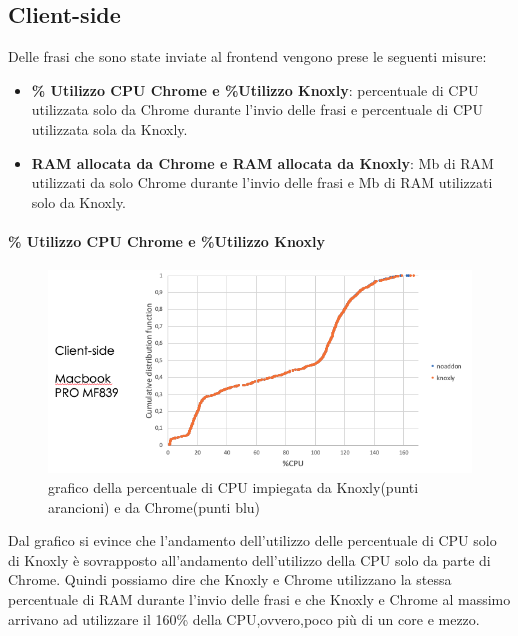 \subsection{Client-side}
\label{sec:quantClient}
Delle frasi che sono state inviate al frontend vengono prese le seguenti misure:
\begin{itemize}
    \item \textbf{\% Utilizzo CPU Chrome e \%Utilizzo Knoxly}: percentuale di CPU utilizzata solo da Chrome durante l'invio delle frasi e percentuale di CPU utilizzata sola da Knoxly. 
    \item \textbf{RAM allocata da Chrome e RAM allocata da Knoxly}: Mb di RAM utilizzati da solo Chrome durante l'invio delle frasi e Mb di RAM utilizzati solo da Knoxly.
\end{itemize}

\paragraph{\% Utilizzo CPU Chrome e \%Utilizzo Knoxly}
\begin{figure}[h!t]
    \centering
    \includegraphics[width=15cm]{Figure/quantitativa/CPU-client.png}
    \caption{grafico della percentuale di CPU impiegata da Knoxly(punti arancioni) e da Chrome(punti blu)}
    \label{fig:clientCPU}
\end{figure}
\FloatBarrier

Dal grafico si evince che l'andamento dell'utilizzo delle percentuale di CPU solo di Knoxly è sovrapposto all'andamento dell'utilizzo della CPU solo da parte di Chrome. Quindi possiamo dire che Knoxly e Chrome utilizzano la stessa percentuale di RAM durante l'invio delle frasi e che Knoxly e Chrome al massimo arrivano ad utilizzare il 160\% della CPU,ovvero,poco più di un core e mezzo.

